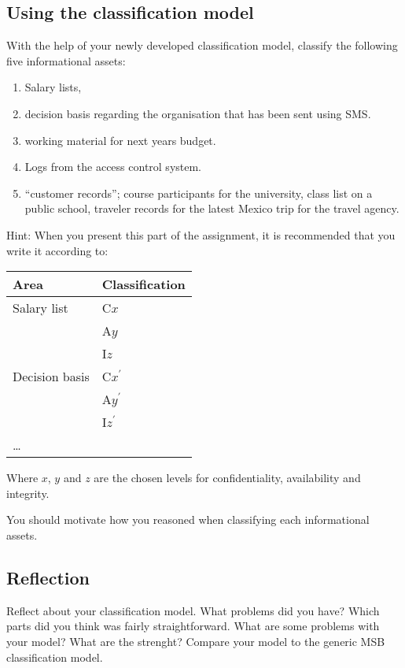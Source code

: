 \documentclass[a4paper]{llncs}
\begin{document}
\subsection{Using the classification model}
\label{sec:use}
\noindent
With the help of your newly developed classification model, classify the
following five informational assets:
\begin{enumerate}
  \item Salary lists,
  \item decision basis regarding the organisation that has been sent using SMS.
  \item working material for next years budget.
  \item Logs from the access control system.
  \item \enquote{customer records}; course participants for the university,
    class list on a public school, traveler records for the latest Mexico trip
    for the travel agency.
\end{enumerate}
\begin{framed}\noindent
  Hint: When you present this part of the assignment, it is recommended that you
  write it according to:
  \begin{center}
    \begin{tabular}{ll}
      \toprule
      \textbf{Area} & \textbf{Classification} \\
      \midrule
      Salary list  & C\(x\) \\
                  & A\(y\) \\
                  & I\(z\) \\
      \midrule
      Decision basis & C\(x^\prime\) \\
                      & A\(y^\prime\) \\
                      & I\(z^\prime\) \\
      \midrule
      \dots \\
      \bottomrule
    \end{tabular}
  \end{center}
  Where \(x\), \(y\) and \(z\) are the chosen levels for confidentiality,
  availability and integrity.
\end{framed}

You should motivate how you reasoned when classifying each informational assets.

\subsection{Reflection}
\label{sec:reflection}
\noindent
Reflect about your classification model. What problems did you have? Which parts
did you think was fairly straightforward. What are some problems with your
model? What are the strenght? Compare your model to the generic MSB
classification model.
\end{document}
